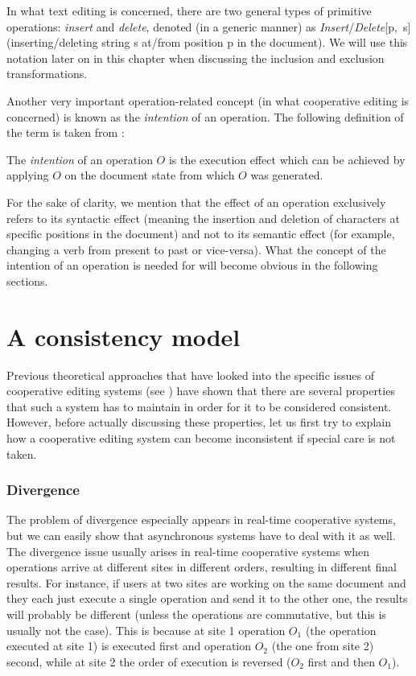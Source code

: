 In what text editing is concerned, there are two general types of primitive
operations: \emph{insert} and \emph{delete}, denoted (in a generic manner) as
\mbox{\emph{Insert}/\emph{Delete}[p, s]} (inserting/deleting string s at/from
position p in the document). We will use this notation later on in this chapter
when discussing the inclusion and exclusion transformations.

Another very important operation-related concept (in what cooperative editing
is concerned) is known as the \emph{intention} of an operation. The following
definition of the term is taken from \cite{sun98a}:

\begin{defi}
The \emph{intention} of an operation $O$ is the execution effect which
can be achieved by applying $O$ on the document state from which $O$ was generated.
\end{defi}

For the sake of clarity, we mention that the effect of an operation exclusively
refers to its syntactic effect (meaning the insertion and deletion of characters
at specific positions in the document) and not to its semantic effect (for example,
changing a verb from present to past or vice-versa). What the concept of the intention
of an operation is needed for will become obvious in the following sections.

\section{A consistency model}

Previous theoretical approaches that have looked into the specific issues of
cooperative editing systems (see \cite{sun96}) have shown that there are several
properties that such a system has to maintain in order for it to be considered
consistent. However, before actually discussing these properties, let us first
try to explain how a cooperative editing system can become inconsistent
if special care is not taken.

\subsubsection{Divergence}

The problem of divergence especially appears in real-time cooperative systems,
but we can easily show that asynchronous systems have to deal with it as well.
The divergence issue usually arises in real-time cooperative systems when
operations arrive at different sites in different orders, resulting in different
final results. For instance, if users at two sites are working on the same document
and they each just execute a single operation and send it to the other one, the
results will probably be different (unless the operations are commutative, but
this is usually not the case). This is because at site 1 operation $O_{1}$ (the operation
executed at site 1) is executed first and operation $O_{2}$ (the one from site 2)
second, while at site 2 the order of execution is reversed ($O_{2}$ first and then
$O_{1}$).

